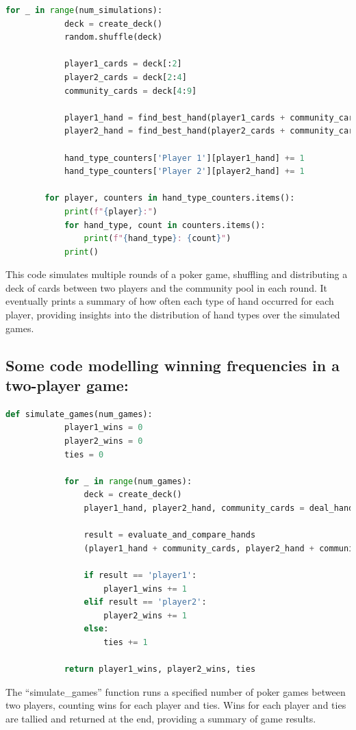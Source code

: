 \documentclass{article}
\begin{document}
\begin{center}
    \begin{lstlisting}[language=Python]
        for _ in range(num_simulations):
            deck = create_deck()
            random.shuffle(deck)
            
            player1_cards = deck[:2]
            player2_cards = deck[2:4]
            community_cards = deck[4:9]
            
            player1_hand = find_best_hand(player1_cards + community_cards)
            player2_hand = find_best_hand(player2_cards + community_cards)
            
            hand_type_counters['Player 1'][player1_hand] += 1
            hand_type_counters['Player 2'][player2_hand] += 1

        for player, counters in hand_type_counters.items():
            print(f"{player}:")
            for hand_type, count in counters.items():
                print(f"{hand_type}: {count}")
            print()
        \end{lstlisting}
\end{center}

This code simulates multiple rounds of a poker game, shuffling and 
distributing a deck of cards between two players and the community 
pool in each round. It eventually prints a summary of how often 
each type of hand occurred for each player, providing insights into 
the distribution of hand types over the simulated games.

\subsection*{Some code modelling winning frequencies in a two-player game:}

\begin{center}
    \begin{lstlisting}[language=Python]
        def simulate_games(num_games):
            player1_wins = 0
            player2_wins = 0
            ties = 0
            
            for _ in range(num_games):
                deck = create_deck()
                player1_hand, player2_hand, community_cards = deal_hands(deck)
                
                result = evaluate_and_compare_hands
                (player1_hand + community_cards, player2_hand + community_cards)
                
                if result == 'player1':
                    player1_wins += 1
                elif result == 'player2':
                    player2_wins += 1
                else:
                    ties += 1
            
            return player1_wins, player2_wins, ties
    \end{lstlisting}
\end{center}

The ``simulate\_games'' function runs a specified number of poker 
games between two players, counting wins for each player and ties.
Wins for each player and ties are tallied and returned at the end, 
providing a summary of game results.
\end{document}
